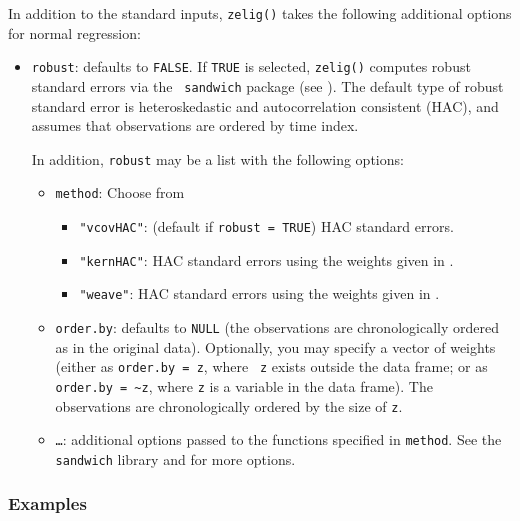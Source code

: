 In addition to the standard inputs, {\tt zelig()} takes the following
additional options for normal regression:  
\begin{itemize}
\item {\tt robust}: defaults to {\tt FALSE}.  If {\tt TRUE} is
selected, {\tt zelig()} computes robust standard errors via the {\tt
sandwich} package (see \cite{Zeileis04}).  The default type of robust
standard error is heteroskedastic and autocorrelation consistent (HAC),
and assumes that observations are ordered by time index.

In addition, {\tt robust} may be a list with the following options:  
\begin{itemize}
\item {\tt method}:  Choose from 
\begin{itemize}
\item {\tt "vcovHAC"}: (default if {\tt robust = TRUE}) HAC standard
errors. 
\item {\tt "kernHAC"}: HAC standard errors using the
weights given in \cite{Andrews91}. 
\item {\tt "weave"}: HAC standard errors using the
weights given in \cite{LumHea99}.  
\end{itemize}  
\item {\tt order.by}: defaults to {\tt NULL} (the observations are
chronologically ordered as in the original data).  Optionally, you may
specify a vector of weights (either as {\tt order.by = z}, where {\tt
z} exists outside the data frame; or as {\tt order.by = \~{}z}, where
{\tt z} is a variable in the data frame).  The observations are
chronologically ordered by the size of {\tt z}.
\item {\tt \dots}:  additional options passed to the functions 
specified in {\tt method}.   See the {\tt sandwich} library and
\cite{Zeileis04} for more options.   
\end{itemize}
\end{itemize}

\subsubsection{Examples}

